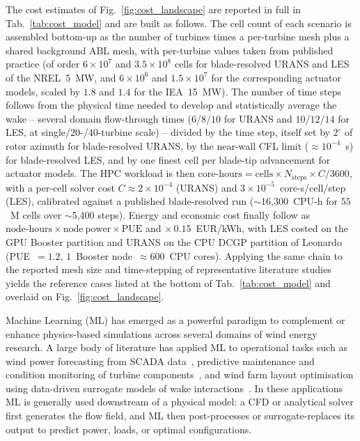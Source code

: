 The cost estimates of Fig.~\ref{fig:cost_landscape} are reported in full in Tab.~\ref{tab:cost_model} and are built as follows. The cell count of each scenario is assembled bottom-up as the number of turbines times a per-turbine mesh plus a shared background ABL mesh, with per-turbine values taken from published practice (of order $6\times10^{7}$ and $3.5\times10^{8}$ cells for blade-resolved URANS and LES of the NREL~5~MW, and $6\times10^{6}$ and $1.5\times10^{7}$ for the corresponding actuator models, scaled by $1.8$ and $1.4$ for the IEA~15~MW). The number of time steps follows from the physical time needed to develop and statistically average the wake -- several domain flow-through times ($6/8/10$ for URANS and $10/12/14$ for LES, at single/$20$-/$40$-turbine scale) -- divided by the time step, itself set by $2^{\circ}$ of rotor azimuth for blade-resolved URANS, by the near-wall CFL limit ($\approx10^{-4}$~s) for blade-resolved LES, and by one finest cell per blade-tip advancement for actuator models. The HPC workload is then $\mathrm{core\text{-}hours}=\mathrm{cells}\times N_\mathrm{steps}\times C/3600$, with a per-cell solver cost $C\approx2\times10^{-4}$ (URANS) and $3\times10^{-5}$~core-s/cell/step (LES), calibrated against a published blade-resolved run ($\sim$16{,}300~CPU-h for $55$~M cells over $\sim$5{,}400 steps). Energy and economic cost finally follow as $\mathrm{node\text{-}hours}\times\mathrm{node\ power}\times\mathrm{PUE}$ and $\times\,0.15$~EUR/kWh, with LES costed on the GPU Booster partition and URANS on the CPU DCGP partition of Leonardo (PUE~$=1.2$, $1$~Booster node~$\approx600$~CPU cores). Applying the same chain to the reported mesh size and time-stepping of representative literature studies yields the reference cases listed at the bottom of Tab.~\ref{tab:cost_model} and overlaid on Fig.~\ref{fig:cost_landscape}.



Machine Learning (ML) has emerged as a powerful paradigm to complement or enhance physics-based simulations across several domains of wind energy research. A large body of literature has applied ML to operational tasks such as wind power forecasting from SCADA data~\cite{Infield2022,Moss2023}, predictive maintenance and condition monitoring of turbine components~\cite{Infield2022}, and wind farm layout optimisation using data-driven surrogate models of wake interactions~\cite{GholamiAnjiraki2025,YANG2023119240}. In these applications ML is generally used downstream of a physical model: a CFD or analytical solver first generates the flow field, and ML then post-processes or surrogate-replaces its output to predict power, loads, or optimal configurations.

